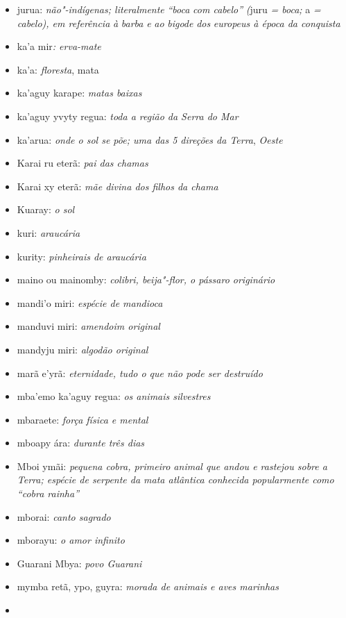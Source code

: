 \begin{itemize}
{  pelos} \emph{caminhos revelados} 
\item
  jurua: \emph{não"-indígenas; literalmente} \emph{``boca} \emph{com
  cabelo''} \emph{(}juru \emph{= boca;} a \emph{=} \emph{cabelo), em
  referência} \emph{à} \emph{barba} \emph{e} \emph{ao} \emph{bigode} \emph{dos} \emph{europeus
  à época da conquista} 
\item
  ka'a mir\emph{: erva-mate}
\item
  ka'a: \emph{floresta}, mata
\item
  ka'aguy karape: \emph{matas baixas}
\item
  ka'aguy yvyty regua: \emph{toda a região da Serra do Mar} 
\item
  ka'arua: \emph{onde o sol se põe; uma das 5 direções da Terra},
  \emph{Oeste} 
\item
  Karai ru eterã: \emph{pai das chamas}
\item
  Karai xy eterã: \emph{mãe divina dos filhos da chama}
\item
  Kuaray: \emph{o sol}
\item
  kuri: \emph{araucária}
\item
  kurity: \emph{pinheirais de araucária}
\item
  maino ou mainomby: \emph{colibri, beija"-flor, o pássaro originário}
\item
  mandi'o miri: \emph{espécie de mandioca}
\item
  manduvi miri: \emph{amendoim original}
\item
  mandyju miri: \emph{algodão original}
\item
  marã e'yrã: \emph{eternidade, tudo o que não pode ser destruído}
\item
  mba'emo ka'aguy regua: \emph{os animais silvestres}
\item
  mbaraete: \emph{força física e mental}
\item
  mboapy ára: \emph{durante três dias}
\item
  Mboi ymãi: \emph{pequena cobra, primeiro animal que andou e rastejou
  sobre a Terra; espécie de serpente da mata atlântica conhecida
  popularmente como ``cobra rainha''}
\item
  mborai: \emph{canto sagrado}
\item
  mborayu: \emph{o amor infinito}
\item
  Guarani Mbya: \emph{povo Guarani}
\item
  mymba retã, ypo, guyra: \emph{morada de animais e aves marinhas}
\item

\end{itemize}
